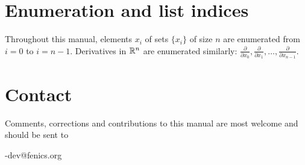 \section*{Enumeration and list indices}

Throughout this manual, elements $x_i$ of sets $\{x_i\}$ of size $n$
are enumerated from $i = 0$ to $i = n-1$. Derivatives in $\mathbb{R}^n$ are
enumerated similarly:
$\frac{\partial}{\partial x_0}, \frac{\partial}{\partial x_1},
 \ldots, \frac{\partial}{\partial x_{n-1}}$.

\section*{Contact}

Comments, corrections and contributions to this manual are most welcome
and should be sent to
\begin{macrocode}
\packagett{}-dev@fenics.org    
\end{macrocode}
